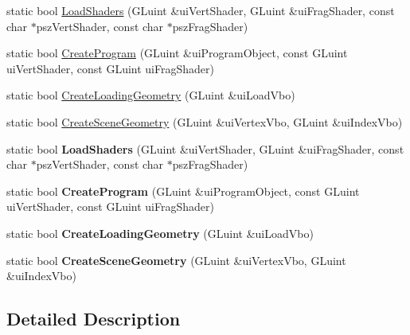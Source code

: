 \begin{DoxyCompactItemize}
\item 
static bool \hyperlink{class_o_g_l_e_s2_multi_threading_a8e1ddaa0bbfb8003f8b2b9973e4b1630}{Load\+Shaders} (G\+Luint \&ui\+Vert\+Shader, G\+Luint \&ui\+Frag\+Shader, const char $\ast$psz\+Vert\+Shader, const char $\ast$psz\+Frag\+Shader)
\item 
static bool \hyperlink{class_o_g_l_e_s2_multi_threading_ab9fc8781287b3c5315cbff37c9f366df}{Create\+Program} (G\+Luint \&ui\+Program\+Object, const G\+Luint ui\+Vert\+Shader, const G\+Luint ui\+Frag\+Shader)
\item 
static bool \hyperlink{class_o_g_l_e_s2_multi_threading_a260625f6c1a4288ab3ac030e3b710615}{Create\+Loading\+Geometry} (G\+Luint \&ui\+Load\+Vbo)
\item 
static bool \hyperlink{class_o_g_l_e_s2_multi_threading_a347b8150a90c315e0df772b4860e2249}{Create\+Scene\+Geometry} (G\+Luint \&ui\+Vertex\+Vbo, G\+Luint \&ui\+Index\+Vbo)
\item 
\hypertarget{class_o_g_l_e_s2_multi_threading_a39f49fb038820c3c362cf4779316ea47}{static bool {\bfseries Load\+Shaders} (G\+Luint \&ui\+Vert\+Shader, G\+Luint \&ui\+Frag\+Shader, const char $\ast$psz\+Vert\+Shader, const char $\ast$psz\+Frag\+Shader)}\label{class_o_g_l_e_s2_multi_threading_a39f49fb038820c3c362cf4779316ea47}

\item 
\hypertarget{class_o_g_l_e_s2_multi_threading_a455fd44f86d83069b31ccc0f475803c3}{static bool {\bfseries Create\+Program} (G\+Luint \&ui\+Program\+Object, const G\+Luint ui\+Vert\+Shader, const G\+Luint ui\+Frag\+Shader)}\label{class_o_g_l_e_s2_multi_threading_a455fd44f86d83069b31ccc0f475803c3}

\item 
\hypertarget{class_o_g_l_e_s2_multi_threading_a3b4fd508e6fd0a0a9ed5c94e949e76f0}{static bool {\bfseries Create\+Loading\+Geometry} (G\+Luint \&ui\+Load\+Vbo)}\label{class_o_g_l_e_s2_multi_threading_a3b4fd508e6fd0a0a9ed5c94e949e76f0}

\item 
\hypertarget{class_o_g_l_e_s2_multi_threading_a647b5f9348b44ce1bf83053933373252}{static bool {\bfseries Create\+Scene\+Geometry} (G\+Luint \&ui\+Vertex\+Vbo, G\+Luint \&ui\+Index\+Vbo)}\label{class_o_g_l_e_s2_multi_threading_a647b5f9348b44ce1bf83053933373252}

\end{DoxyCompactItemize}


\subsection{Detailed Description}


